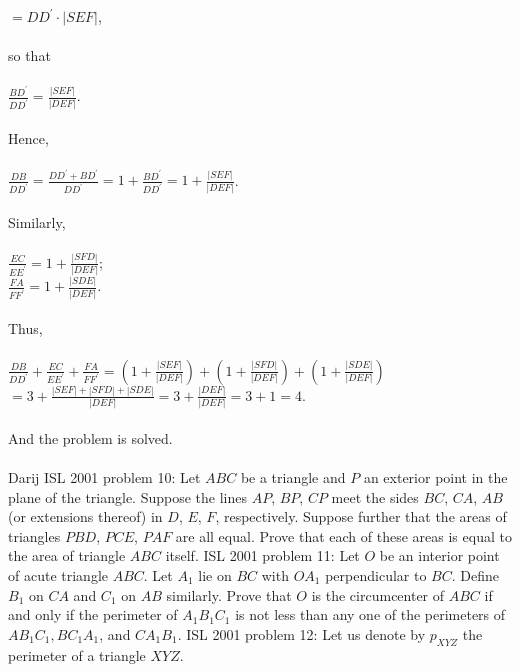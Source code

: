 $=DD^{\prime}\cdot\left|SEF\right|$, \\\\
so that \\\\
$\frac{BD^{\prime}}{DD^{\prime}}=\frac{\left|SEF\right|}{\left|DEF\right|}$. \\\\
Hence, \\\\
$\frac{DB}{DD^{\prime}}=\frac{DD^{\prime}+BD^{\prime}}{DD^{\prime}}=1+\frac{BD^{\prime}}{DD^{\prime}}=1+\frac{\left|SEF\right|}{\left|DEF\right|}$. \\\\
Similarly, \\\\
$\frac{EC}{EE^{\prime}}=1+\frac{\left|SFD\right|}{\left|DEF\right|}$; \\
$\frac{FA}{FF^{\prime}}=1+\frac{\left|SDE\right|}{\left|DEF\right|}$. \\\\
Thus, \\\\
$\frac{DB}{DD^{\prime}}+\frac{EC}{EE^{\prime}}+\frac{FA}{FF^{\prime}}=\left(1+\frac{\left|SEF\right|}{\left|DEF\right|}\right)+\left(1+\frac{\left|SFD\right|}{\left|DEF\right|}\right)+\left(1+\frac{\left|SDE\right|}{\left|DEF\right|}\right)$ \\
$=3+\frac{\left|SEF\right|+\left|SFD\right|+\left|SDE\right|}{\left|DEF\right|}=3+\frac{\left|DEF\right|}{\left|DEF\right|}=3+1=4$. \\\\
And the problem is solved. \\\\
Darij 
ISL 2001 problem 10:  Let $ABC$ be a triangle and $P$ an exterior point in the plane of the triangle. Suppose the lines $AP$, $BP$, $CP$ meet the sides $BC$, $CA$, $AB$ (or extensions thereof) in $D$, $E$, $F$, respectively. Suppose further that the areas of triangles $PBD$, $PCE$, $PAF$ are all equal. Prove that each of these areas is equal to the area of triangle $ABC$ itself. 
ISL 2001 problem 11:  Let $O$ be an interior point of acute triangle $ABC$. Let $A_1$ lie on $BC$ with $OA_1$ perpendicular to $BC$. Define $B_1$ on $CA$ and $C_1$ on $AB$ similarly. Prove that $O$ is the circumcenter of $ABC$ if and only if the perimeter of $A_1B_1C_1$ is not less than any one of the perimeters of $AB_1C_1, BC_1A_1$, and $CA_1B_1$. 
ISL 2001 problem 12:  Let us denote by $p_{XYZ}$ the perimeter of a triangle $XYZ$. \\\\
